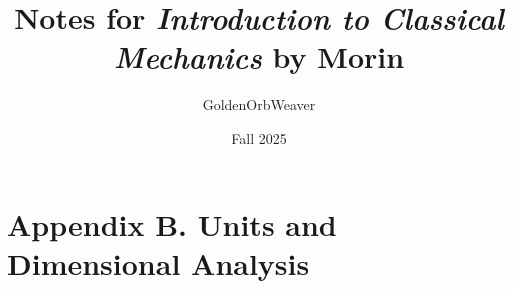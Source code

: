 \documentclass{article}
\title{\textbf{Notes for \textit{Introduction to Classical Mechanics} by Morin}}
\author{GoldenOrbWeaver}
\date{Fall 2025}
\begin{document}
\maketitle

\tableofcontents{\textbf{}}

\pagebreak

\pagestyle{fancy}
\fancyhead{}
\fancyhead[L]{\thetitle}

\section{Appendix B. Units and Dimensional Analysis}
\end{document}
